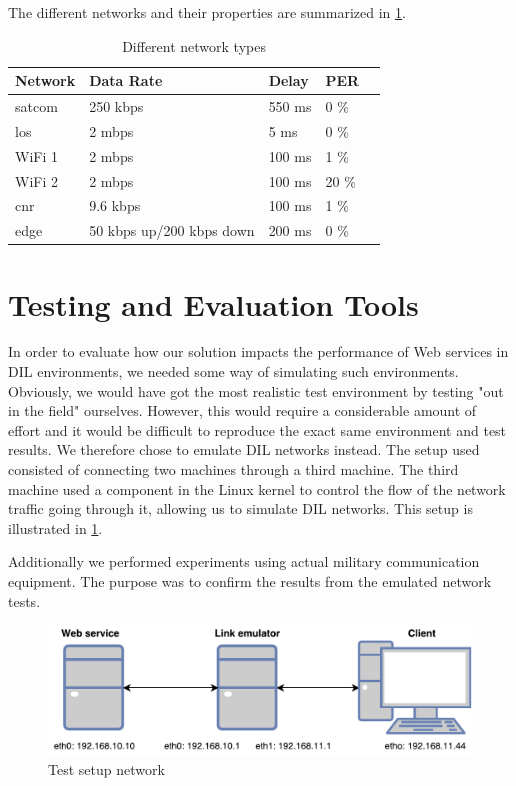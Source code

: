 The different networks and their properties are summarized in
\cref{table-network-types}.

\begin{table}[h]
\begin{tabular}{| l | l | l | l | l |}
\hline
  \textbf{Network} & \textbf{Data Rate} & \textbf{Delay} & \textbf{PER} \\ \hline
  \gls{satcom} & 250 kbps & 550 ms & 0 \% \\ \hline
  \gls{los} & 2 mbps & 5 ms & 0 \% \\ \hline
  WiFi 1 & 2 mbps & 100 ms & 1 \% \\ \hline
  WiFi 2 & 2 mbps & 100 ms & 20 \% \\ \hline
  \gls{cnr} & 9.6 kbps & 100 ms & 1 \% \\ \hline
  \gls{edge} & 50 kbps up/200 kbps down & 200 ms & 0 \% \\ \hline
\end{tabular}
\caption{Different network types}
\label{table-network-types}
\end{table}


\section{Testing and Evaluation Tools}

In order to evaluate how our solution impacts the performance of Web services in
DIL environments, we needed some way of simulating such environments. Obviously,
we would have got the most realistic test environment by testing "out in the
field" ourselves. However, this would require a considerable amount of effort
and it would be difficult to reproduce the exact same environment and test
results. We therefore chose to emulate DIL networks instead. The setup used
consisted of connecting two machines through a third machine. The third machine
used a component in the Linux kernel to control the flow of the network traffic
going through it, allowing us to simulate DIL networks. This setup is
illustrated in \cref{figure-testing-environment}.

Additionally we performed experiments using actual military communication
equipment. The purpose was to confirm the results from the emulated network
tests.

\begin{figure}[h]
\includegraphics[scale=0.73]{images/testing_environment.pdf}
\caption{Test setup network}
\label{figure-testing-environment}
\end{figure}

